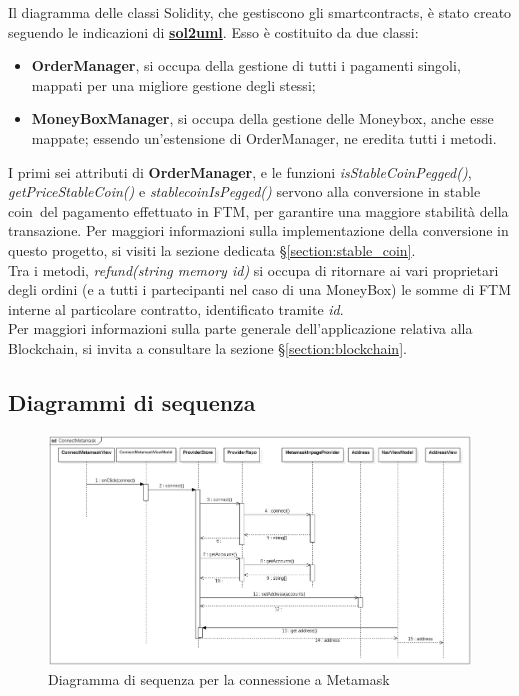 Il diagramma delle classi Solidity, che gestiscono gli smartcontracts, è stato creato seguendo le indicazioni di \href{https://github.com/naddison36/sol2uml}{\textbf{sol2uml}}.
Esso è costituito da due classi:
\begin{itemize}
    \item \textbf{OrderManager}, si occupa della gestione di tutti i pagamenti singoli, mappati per una migliore gestione degli stessi;
    \item \textbf{MoneyBoxManager}, si occupa della gestione delle Moneybox, anche esse mappate; essendo un'estensione di OrderManager, ne eredita tutti i metodi.
\end{itemize}

I primi sei attributi di \textbf{OrderManager}, e le funzioni \textit{isStableCoinPegged()}, \textit{getPriceStableCoin()} e \textit{stablecoinIsPegged()} 
servono alla conversione in stable coin\glo\ del pagamento effettuato in FTM, per garantire una maggiore stabilità della transazione. Per maggiori informazioni sulla implementazione della conversione in questo progetto, si visiti la sezione dedicata §\ref{section:stable_coin}.\\
Tra i metodi, \textit{refund(string memory id)} si occupa di ritornare ai vari proprietari degli ordini 
(e a tutti i partecipanti nel caso di una MoneyBox) le somme di FTM interne al particolare contratto, identificato tramite \textit{id}.
\\
Per maggiori informazioni sulla parte generale dell'applicazione relativa alla Blockchain, si invita a consultare la sezione §\ref{section:blockchain}.



\subsection{Diagrammi di sequenza}

\begin{figure}[H]
    \centering
    \includegraphics[scale = 0.45]{immagini/diagrammaMeta.png}
    \caption{Diagramma di sequenza per la connessione a Metamask}
\end{figure}


